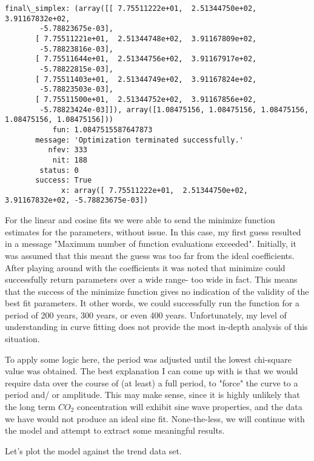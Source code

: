 \documentclass[11pt]{article}
\begin{document}
    \begin{Verbatim}[commandchars=\\\{\}]
 final\_simplex: (array([[ 7.75511222e+01,  2.51344750e+02,  3.91167832e+02,
        -5.78823675e-03],
       [ 7.75511221e+01,  2.51344748e+02,  3.91167809e+02,
        -5.78823816e-03],
       [ 7.75511644e+01,  2.51344756e+02,  3.91167917e+02,
        -5.78822815e-03],
       [ 7.75511403e+01,  2.51344749e+02,  3.91167824e+02,
        -5.78823503e-03],
       [ 7.75511500e+01,  2.51344752e+02,  3.91167856e+02,
        -5.78823424e-03]]), array([1.08475156, 1.08475156, 1.08475156, 1.08475156, 1.08475156]))
           fun: 1.0847515587647873
       message: 'Optimization terminated successfully.'
          nfev: 333
           nit: 188
        status: 0
       success: True
             x: array([ 7.75511222e+01,  2.51344750e+02,  3.91167832e+02, -5.78823675e-03])

    \end{Verbatim}

    For the linear and cosine fits we were able to send the minimize
function estimates for the parameters, without issue. In this case, my
first guess resulted in a message "Maximum number of function
evaluations exceeded". Initially, it was assumed that this meant the
guess was too far from the ideal coefficients. After playing around with
the coefficients it was noted that minimize could successfully return
parameters over a wide range- too wide in fact. This means that the
success of the minimize function gives no indication of the validity of
the best fit parameters. It other words, we could successfully run the
function for a period of 200 years, 300 years, or even 400 years.
Unfortunately, my level of understanding in curve fitting does not
provide the most in-depth analysis of this situation.

To apply some logic here, the period was adjusted until the lowest
chi-square value was obtained. The best explanation I can come up with
is that we would require data over the course of (at least) a full
period, to "force" the curve to a period and/ or amplitude. This may
make sense, since it is highly unlikely that the long term \(CO_2\)
concentration will exhibit sine wave properties, and the data we have
would not produce an ideal sine fit. None-the-less, we will continue
with the model and attempt to extract some meaningful results.

Let's plot the model against the trend data set.
\end{document}
